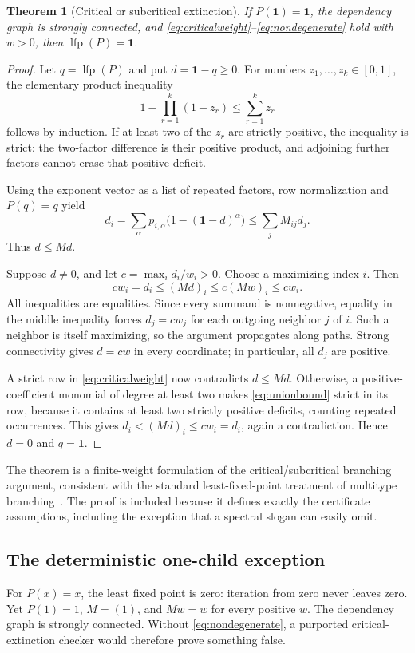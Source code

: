 \documentclass[11pt,a4paper]{article}
\newtheorem{theorem}{Theorem}[section]
\theoremstyle{definition}\newtheorem{definition}[theorem]{Definition}
\theoremstyle{remark}\newtheorem{remark}[theorem]{Remark}
\newcommand{\one}{\mathbf 1}\newcommand{\zero}{\mathbf 0}
\newcommand{\lfp}{\operatorname{lfp}}\newcommand{\diag}{\operatorname{diag}}
\begin{document}
\begin{theorem}[Critical or subcritical extinction]
\label{thm:critical}
If $P(\one)=\one$, the dependency graph is strongly connected, and \eqref{eq:criticalweight}--\eqref{eq:nondegenerate} hold with $w>0$, then $\lfp(P)=\one$.
\end{theorem}
\begin{proof}
Let $q=\lfp(P)$ and put $d=\one-q\ge0$. For numbers $z_1,\ldots,z_k\in[0,1]$, the elementary product inequality
\begin{equation}
 \label{eq:unionbound}
 1-\prod_{r=1}^k(1-z_r)\le\sum_{r=1}^kz_r
\end{equation}
follows by induction. If at least two of the $z_r$ are strictly positive, the inequality is strict: the two-factor difference is their positive product, and adjoining further factors cannot erase that positive deficit.

Using the exponent vector as a list of repeated factors, row normalization and $P(q)=q$ yield
\[
 d_i=\sum_\alpha p_{i,\alpha}\bigl(1-(\one-d)^\alpha\bigr)
 \le\sum_jM_{ij}d_j.
\]
Thus $d\le Md$.

Suppose $d\ne0$, and let $c=\max_i d_i/w_i>0$. Choose a maximizing index $i$. Then
\[
 cw_i=d_i\le(Md)_i\le c(Mw)_i\le cw_i.
\]
All inequalities are equalities. Since every summand is nonnegative, equality in the middle inequality forces $d_j=cw_j$ for each outgoing neighbor $j$ of $i$. Such a neighbor is itself maximizing, so the argument propagates along paths. Strong connectivity gives $d=cw$ in every coordinate; in particular, all $d_j$ are positive.

A strict row in \eqref{eq:criticalweight} now contradicts $d\le Md$. Otherwise, a positive-coefficient monomial of degree at least two makes \eqref{eq:unionbound} strict in its row, because it contains at least two strictly positive deficits, counting repeated occurrences. This gives $d_i<(Md)_i\le cw_i=d_i$, again a contradiction. Hence $d=0$ and $q=\one$.
\end{proof}

The theorem is a finite-weight formulation of the critical/subcritical branching argument, consistent with the standard least-fixed-point treatment of multitype branching~\cite{etessami-stewart-yannakakis}. The proof is included because it defines exactly the certificate assumptions, including the exception that a spectral slogan can easily omit.

\subsection{The deterministic one-child exception}
For $P(x)=x$, the least fixed point is zero: iteration from zero never leaves zero. Yet $P(1)=1$, $M=(1)$, and $Mw=w$ for every positive $w$. The dependency graph is strongly connected. Without \eqref{eq:nondegenerate}, a purported critical-extinction checker would therefore prove something false.
\end{document}
